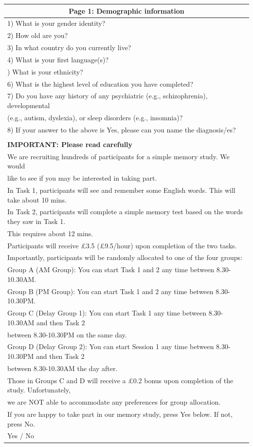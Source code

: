 \documentclass[
]{article}
\begin{document}
\begin{table}[H]
\centering
\begin{tabular}{l}
\toprule
\multicolumn{1}{c}{Page 1: Demographic information}\\
\midrule
1)  What is your gender identity?\\
2)  How old are you?\\
3)  In what country do you currently live?\\
4)  What is your first language(s)?\\
\addlinespace
5)  What is your ethnicity?\\
6)  What is the highest level of education you have completed?\\
7)  Do you have any history of any psychiatric (e.g., schizophrenia), developmental\\
(e.g., autism, dyslexia), or sleep disorders (e.g., insomnia)?\\
8)  If your answer to the above is Yes, please can you name the diagnosis/es?\\
\midrule
\addlinespace
\multicolumn{1}{c}{Page 2: Outline of the main study}\\
\midrule
\textbf{IMPORTANT: Please read carefully}\\
We are recruiting hundreds of participants for a simple memory study. We would\\
like to see if you may be interested in taking part.\\
In Task 1, participants will see and remember some English words. This will take about 10 mins.\\
\addlinespace
In Task 2, participants will complete a simple memory test based on the words they saw in Task 1.\\
This requires about 12 mins.\\
Participants will receive £3.5 (£9.5/hour) upon completion of the two tasks.\\
Importantly, participants will be randomly allocated to one of the four groups:\\
Group A (AM Group): You can start Task 1 and 2 any time between 8.30-10.30AM.\\
\addlinespace
Group B (PM Group): You can start Task 1 and 2 any time between 8.30-10.30PM.\\
Group C (Delay Group 1): You can start Task 1 any time between 8.30-10.30AM and then Task 2\\
between 8.30-10.30PM on the same day.\\
Group D (Delay Group 2): You can start Session 1 any time between 8.30-10.30PM and then Task 2\\
between 8.30-10.30AM the day after.\\
\addlinespace
Those in Groups C and D will receive a £0.2 bonus upon completion of the study. Unfortunately,\\
we are NOT able to accommodate any preferences for group allocation.\\
If you are happy to take part in our memory study, press Yes below. If not, press No.\\
Yes / No\\
\bottomrule
\end{tabular}
\end{table}
\end{document}

